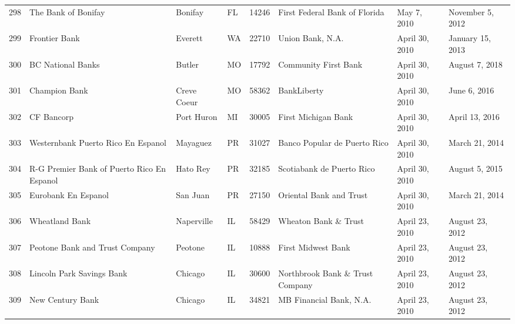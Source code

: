 \begin{tabular}{llllrlll}
298 &                                The Bank of Bonifay &             Bonifay &  FL &  14246 &                      First Federal Bank of Florida &         May 7, 2010 &    November 5, 2012 \\
299 &                                      Frontier Bank &             Everett &  WA &  22710 &                                   Union Bank, N.A. &      April 30, 2010 &    January 15, 2013 \\
300 &                                  BC National Banks &              Butler &  MO &  17792 &                               Community First Bank &      April 30, 2010 &      August 7, 2018 \\
301 &                                      Champion Bank &         Creve Coeur &  MO &  58362 &                                        BankLiberty &      April 30, 2010 &        June 6, 2016 \\
302 &                                         CF Bancorp &          Port Huron &  MI &  30005 &                                First Michigan Bank &      April 30, 2010 &      April 13, 2016 \\
303 &                Westernbank Puerto Rico  En Espanol &            Mayaguez &  PR &  31027 &                       Banco Popular de Puerto Rico &      April 30, 2010 &      March 21, 2014 \\
304 &        R-G Premier Bank of Puerto Rico  En Espanol &            Hato Rey &  PR &  32185 &                          Scotiabank de Puerto Rico &      April 30, 2010 &      August 5, 2015 \\
305 &                               Eurobank  En Espanol &            San Juan &  PR &  27150 &                            Oriental Bank and Trust &      April 30, 2010 &      March 21, 2014 \\
306 &                                     Wheatland Bank &          Naperville &  IL &  58429 &                               Wheaton Bank \& Trust &      April 23, 2010 &     August 23, 2012 \\
307 &                     Peotone Bank and Trust Company &             Peotone &  IL &  10888 &                                 First Midwest Bank &      April 23, 2010 &     August 23, 2012 \\
308 &                          Lincoln Park Savings Bank &             Chicago &  IL &  30600 &                    Northbrook Bank \& Trust Company &      April 23, 2010 &     August 23, 2012 \\
309 &                                   New Century Bank &             Chicago &  IL &  34821 &                            MB Financial Bank, N.A. &      April 23, 2010 &     August 23, 2012 \\

\end{tabular}
